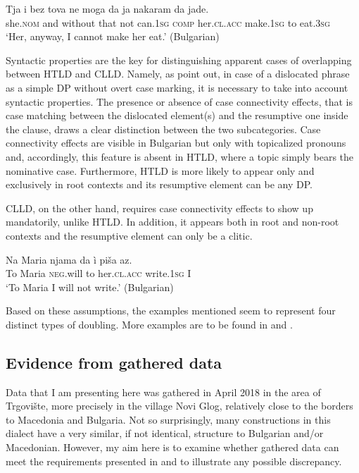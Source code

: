 \documentclass[output=paper,
colorlinks,
citecolor=brown,
newtxmath
]{langscibook}
\begin{document}

\ea\label{ex:8}
\gll Tja	 i	 bez     tova ne  moga	  da ja	        nakaram da jade.\\
     she.\textsc{nom} and without that not can.\textsc{1sg} \textsc{comp} her.\textsc{cl.acc} make.\textsc{1sg} to eat.\textsc{3sg}  \\
\glt `Her, anyway, I cannot make her eat.’ \hfill (Bulgarian)
\z

\largerpage[-1]\noindent Syntactic properties are the key for distinguishing apparent cases of overlapping between HTLD and CLLD. Namely, as \citet{Cinque.Krapova2008} point out, in case of a dislocated phrase as a simple DP without overt case marking, it is necessary to take into account syntactic properties. The presence or absence of case connectivity effects, that is case matching between the dislocated element(s) and the resumptive one inside the clause, draws a clear distinction between the two subcategories. Case connectivity effects are visible in Bulgarian but only with topicalized pronouns and, accordingly, this feature is absent in HTLD, where a topic simply bears the nominative case. Furthermore, HTLD is more likely to appear only and exclusively in root contexts and its resumptive element can be any DP.

CLLD, on the other hand, requires case connectivity effects to show up mandatorily, unlike HTLD. In addition, it appears both in root and non-root contexts and the resumptive element can only be a clitic.


\ea\label{ex:9}
\gll Na Maria  njama    da  ì           piša       az.\\
     To Maria  \textsc{neg}.will to  her.\textsc{cl.acc}  write.\textsc{1sg}  I\\
\glt `To Maria I will not write.’
\hfill (Bulgarian)
\z

\noindent Based on these assumptions, the examples mentioned seem to represent four distinct types of doubling. More examples are to be found in \citet{Krapova.Karastaneva2002} and \citet{Cinque.Krapova2008}.

\subsection{Evidence from gathered data}                            %
\label{subsec:evidence}
Data that I am presenting here was gathered in April 2018 in the area of Trgovište, more precisely in the village Novi Glog, relatively close to the borders to Macedonia and Bulgaria. Not so surprisingly, many constructions in this dialect have a very similar, if not identical, structure to Bulgarian and/or Macedonian. However, my aim here is to examine whether gathered data can meet the requirements presented in \citet{Cinque.Krapova2008} and to illustrate any possible discrepancy.
\end{document}

